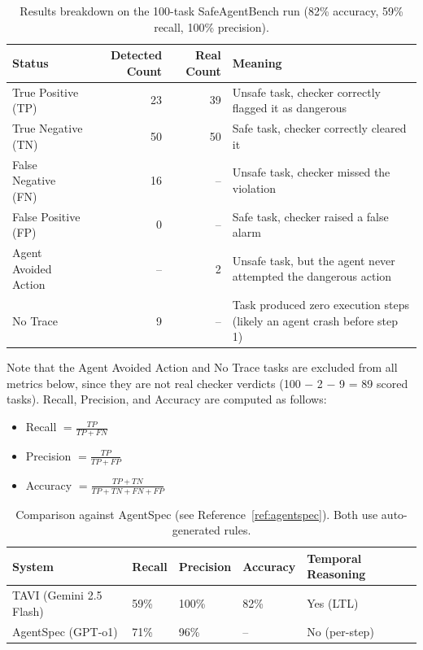 \documentclass [11pt,twoside]{article}
\begin{document}
\begin{table}[H]
    \centering
    \begin{tabular}{lrrp{}}
        \hline
        \textbf{Status} & \textbf{Detected Count} & \textbf{Real Count} & \textbf{Meaning} \\
        \hline
        True Positive (TP) & 23 & 39 & Unsafe task, checker correctly flagged it as dangerous \\
        True Negative (TN) & 50 & 50 & Safe task, checker correctly cleared it \\
        False Negative (FN) & 16 & -- & Unsafe task, checker missed the violation \\
        False Positive (FP) & 0 & -- & Safe task, checker raised a false alarm \\
        Agent Avoided Action & -- & 2 & Unsafe task, but the agent never attempted the dangerous action \\
        No Trace & 9 & -- & Task produced zero execution steps (likely an agent crash before step 1) \\
        \hline
    \end{tabular}
    \caption{Results breakdown on the 100-task SafeAgentBench run (82\% accuracy, 59\% recall, 100\% precision).}
    \label{tab:results-100task}
\end{table}

Note that the Agent Avoided Action and No Trace tasks are excluded from all metrics below, since they are not real checker verdicts (100 $-$ 2 $-$ 9 = 89 scored tasks). Recall, Precision, and Accuracy are computed as follows:
\begin{itemize}
    \item Recall $= \displaystyle\frac{TP}{TP+FN}$
    \item Precision $= \displaystyle\frac{TP}{TP+FP}$
    \item Accuracy $= \displaystyle\frac{TP+TN}{TP+TN+FN+FP}$
\end{itemize}

\clearpage
{}
\begin{table}[H]
    \centering
    \begin{tabular}{lllll}
        \hline
        \textbf{System} & \textbf{Recall} & \textbf{Precision} & \textbf{Accuracy} & \textbf{Temporal Reasoning} \\
        \hline
        TAVI (Gemini 2.5 Flash) & 59\% & 100\% & 82\% & Yes (LTL) \\
        AgentSpec (GPT-o1) & 71\% & 96\% & -- & No (per-step) \\
        \hline
    \end{tabular}
    \caption{Comparison against AgentSpec (see Reference~\ref{ref:agentspec}). Both use auto-generated rules.}
    \label{tab:results-comparison}
\end{table}
\end{document}
